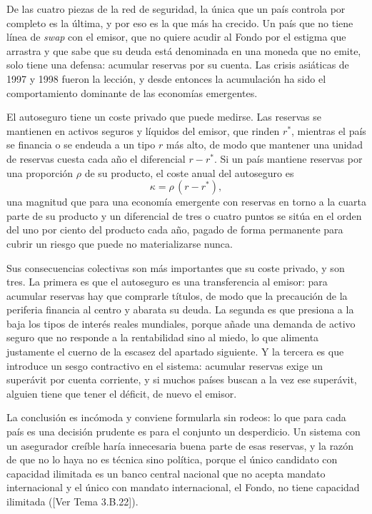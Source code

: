 \documentclass[10pt,a4paper]{article}
\newcommand{\authorfont}[1]{{\fontfamily{EBGaramond-TLF}\selectfont #1}}
\begin{document}
De las cuatro piezas de la red de seguridad, la única que un país controla por completo es la última, y por eso es la que más ha crecido. Un país que no tiene línea de \textit{swap} con el emisor, que no quiere acudir al Fondo por el estigma que arrastra y que sabe que su deuda está denominada en una moneda que no emite, solo tiene una defensa: acumular reservas por su cuenta. Las crisis asiáticas de 1997 y 1998 fueron la lección, y desde entonces la acumulación ha sido el comportamiento dominante de las economías emergentes.

El autoseguro tiene un coste privado que puede medirse. Las reservas se mantienen en activos seguros y líquidos del emisor, que rinden $r^{*}$, mientras el país se financia o se endeuda a un tipo $r$ más alto, de modo que mantener una unidad de reservas cuesta cada año el diferencial $r-r^{*}$. Si un país mantiene reservas por una proporción $\rho$ de su producto, el coste anual del autoseguro es
$$\kappa = \rho\,(r-r^{*}),$$
una magnitud que para una economía emergente con reservas en torno a la cuarta parte de su producto y un diferencial de tres o cuatro puntos se sitúa en el orden del uno por ciento del producto cada año, pagado de forma permanente para cubrir un riesgo que puede no materializarse nunca.

Sus consecuencias colectivas son más importantes que su coste privado, y son tres. La primera es que el autoseguro es una transferencia al emisor: para acumular reservas hay que comprarle títulos, de modo que la precaución de la periferia financia al centro y abarata su deuda. La segunda es que presiona a la baja los tipos de interés reales mundiales, porque añade una demanda de activo seguro que no responde a la rentabilidad sino al miedo, lo que alimenta justamente el cuerno de la escasez del apartado siguiente. Y la tercera es que introduce un sesgo contractivo en el sistema: acumular reservas exige un superávit por cuenta corriente, y si muchos países buscan a la vez ese superávit, alguien tiene que tener el déficit, de nuevo el emisor.

La conclusión es incómoda y conviene formularla sin rodeos: lo que para cada país es una decisión prudente es para el conjunto un desperdicio. Un sistema con un asegurador creíble haría innecesaria buena parte de esas reservas, y la razón de que no lo haya no es técnica sino política, porque el único candidato con capacidad ilimitada es un banco central nacional que no acepta mandato internacional y el único con mandato internacional, el Fondo, no tiene capacidad ilimitada ([\authorfont{Ver Tema 3.B.22}]).
\end{document}
